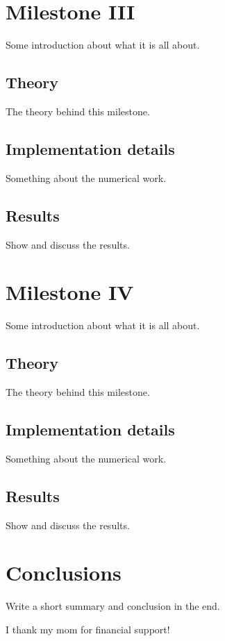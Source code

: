\section{Milestone III}
Some introduction about what it is all about.

\subsection{Theory}
The theory behind this milestone.

\subsection{Implementation details}
Something about the numerical work.

\subsection{Results}
Show and discuss the results.

\section{Milestone IV}
Some introduction about what it is all about.

\subsection{Theory}
The theory behind this milestone.

\subsection{Implementation details}
Something about the numerical work.

\subsection{Results}
Show and discuss the results.

\section{Conclusions}

Write a short summary and conclusion in the end. 

\begin{acknowledgements}
      I thank my mom for financial support!
\end{acknowledgements}







